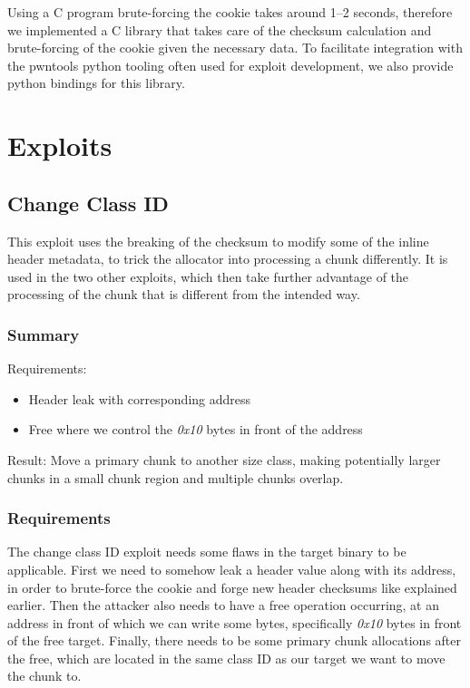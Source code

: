 \documentclass[a4paper,11pt,oneside]{report}
\begin{document}
Using a C program brute-forcing the cookie takes around 1–2 seconds, therefore we
implemented a C library that takes care of the checksum calculation and brute-forcing of
the cookie given the necessary data. To facilitate integration with the pwntools python
tooling often used for exploit development, we also provide python bindings for this
library.

\chapter{Exploits}

\section{Change Class ID}

This exploit uses the breaking of the checksum to modify some of the inline header
metadata, to trick the allocator into processing a chunk differently. It is used in the
two other exploits, which then take further advantage of the processing of the chunk that
is different from the intended way.

\subsection{Summary}

Requirements:
\begin{itemize}
\item Header leak with corresponding address
\item Free where we control the \emph{0x10} bytes in front of the address
\end{itemize}

Result: Move a primary chunk to another size class, making potentially larger chunks in a
small chunk region and multiple chunks overlap.

\subsection{Requirements}

The change class ID exploit needs some flaws in the target binary to be applicable.  First
we need to somehow leak a header value along with its address, in order to brute-force the
cookie and forge new header checksums like explained earlier. Then the attacker also needs
to have a free operation occurring, at an address in front of which we can write some
bytes, specifically \emph{0x10} bytes in front of the free target. Finally, there needs to
be some primary chunk allocations after the free, which are located in the same class ID
as our target we want to move the chunk to.
\end{document}
